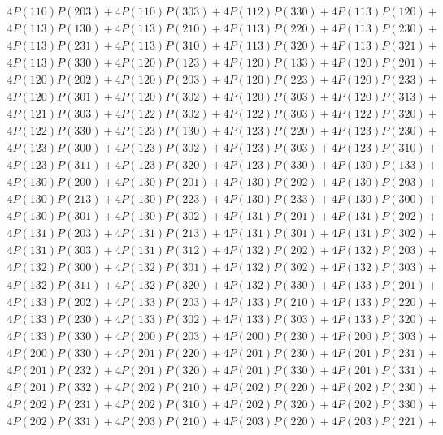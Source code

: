 \begin{align*}
	4P(110)P(203) + 4P(110)P(303) + 4P(112)P(330) + 4P(113)P(120)+ \\ 
	4P(113)P(130) + 4P(113)P(210) + 4P(113)P(220) + 4P(113)P(230)+ \\ 
	4P(113)P(231) + 4P(113)P(310) + 4P(113)P(320) + 4P(113)P(321)+ \\ 
	4P(113)P(330) + 4P(120)P(123) + 4P(120)P(133) + 4P(120)P(201)+ \\ 
	4P(120)P(202) + 4P(120)P(203) + 4P(120)P(223) + 4P(120)P(233)+ \\ 
	4P(120)P(301) + 4P(120)P(302) + 4P(120)P(303) + 4P(120)P(313)+ \\ 
	4P(121)P(303) + 4P(122)P(302) + 4P(122)P(303) + 4P(122)P(320)+ \\ 
	4P(122)P(330) + 4P(123)P(130) + 4P(123)P(220) + 4P(123)P(230)+ \\ 
	4P(123)P(300) + 4P(123)P(302) + 4P(123)P(303) + 4P(123)P(310)+ \\ 
	4P(123)P(311) + 4P(123)P(320) + 4P(123)P(330) + 4P(130)P(133)+ \\ 
	4P(130)P(200) + 4P(130)P(201) + 4P(130)P(202) + 4P(130)P(203)+ \\ 
	4P(130)P(213) + 4P(130)P(223) + 4P(130)P(233) + 4P(130)P(300)+ \\ 
	4P(130)P(301) + 4P(130)P(302) + 4P(131)P(201) + 4P(131)P(202)+ \\ 
	4P(131)P(203) + 4P(131)P(213) + 4P(131)P(301) + 4P(131)P(302)+ \\ 
	4P(131)P(303) + 4P(131)P(312) + 4P(132)P(202) + 4P(132)P(203)+ \\ 
	4P(132)P(300) + 4P(132)P(301) + 4P(132)P(302) + 4P(132)P(303)+ \\ 
	4P(132)P(311) + 4P(132)P(320) + 4P(132)P(330) + 4P(133)P(201)+ \\ 
	4P(133)P(202) + 4P(133)P(203) + 4P(133)P(210) + 4P(133)P(220)+ \\ 
	4P(133)P(230) + 4P(133)P(302) + 4P(133)P(303) + 4P(133)P(320)+ \\ 
	4P(133)P(330) + 4P(200)P(203) + 4P(200)P(230) + 4P(200)P(303)+ \\ 
	4P(200)P(330) + 4P(201)P(220) + 4P(201)P(230) + 4P(201)P(231)+ \\ 
	4P(201)P(232) + 4P(201)P(320) + 4P(201)P(330) + 4P(201)P(331)+ \\ 
	4P(201)P(332) + 4P(202)P(210) + 4P(202)P(220) + 4P(202)P(230)+ \\ 
	4P(202)P(231) + 4P(202)P(310) + 4P(202)P(320) + 4P(202)P(330)+ \\ 
	4P(202)P(331) + 4P(203)P(210) + 4P(203)P(220) + 4P(203)P(221)+ \\ 

\end{align*}
